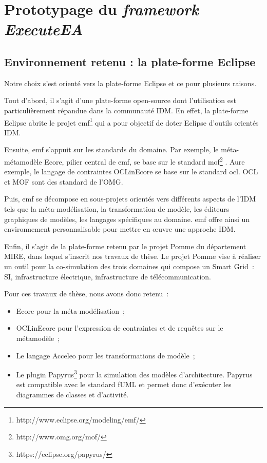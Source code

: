 \chapter{Prototypage du \emph{framework ExecuteEA}}
\label{ch:implem}

\PartialToc


\section{Environnement retenu : la plate-forme Eclipse}

Notre choix s'est orienté vers la plate-forme Eclipse et ce pour plusieurs
raisons.

Tout d'abord, il s'agit d'une plate-forme open-source dont l'utilisation est
particulièrement répandue dans la communauté IDM. En effet, la plate-forme
Eclipse abrite le projet
\gls{emf}\footnote{http://www.eclipse.org/modeling/emf/} qui a pour objectif de
doter Eclipse d'outils orientés IDM.

Ensuite, \gls{emf} s'appuit sur les standards du domaine. Par exemple, le méta-
métamodèle Ecore, pilier central de \gls{emf}, se base sur le standard
\gls{mof}\footnote{http://www.omg.org/mof/} . Aure exemple, le langage de
contraintes OCLinEcore se base sur le standard \gls{ocl}. OCL et MOF sont des
standard de l'OMG.

Puis, \gls{emf} se décompose en sous-projets orientés vers différents aspects de
l'IDM tels que la méta-modélisation, la transformation de modèle, les éditeurs
graphiques de modèles, les langages spécifiques au domaine. \gls{emf} offre
ainsi un environnement personnalisable pour mettre en œuvre une approche IDM.

Enfin, il s'agit de la plate-forme retenu par le projet Pomme du département
MIRE, dans lequel s'inscrit nos travaux de thèse. Le projet Pomme vise à
réaliser un outil pour la co-simulation des trois domaines qui compose un Smart
Grid~: SI, infrastructure électrique, infrastructure de télécommunication.

Pour ces travaux de thèse, nous avons donc retenu~:

\begin{itemize}

    \item Ecore pour la méta-modélisation~;

    \item OCLinEcore pour l'expression de contraintes et de requêtes sur le métamodèle~;

    \item Le langage Acceleo pour les transformations de modèle~;

    \item Le plugin Papyrus\footnote{https://eclipse.org/papyrus/} pour la simulation
    des modèles d'architecture. Papyrus est compatible avec le standard fUML et
    permet donc d'exécuter les diagrammes de classes et d'activité. 

\end{itemize}


